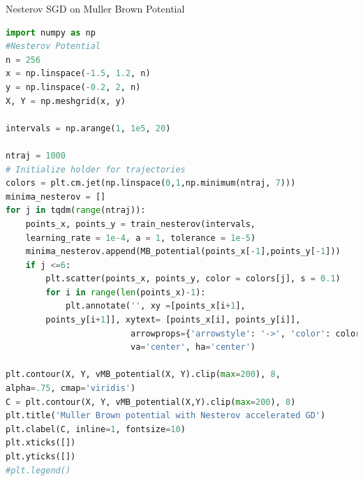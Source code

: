 \documentclass{article}
\begin{document}
\begin{codeblock}{Nesterov SGD on Muller Brown Potential}
\begin{lstlisting}[language=Python]
import numpy as np
#Nesterov Potential 
n = 256
x = np.linspace(-1.5, 1.2, n)
y = np.linspace(-0.2, 2, n)
X, Y = np.meshgrid(x, y)

intervals = np.arange(1, 1e5, 20)

ntraj = 1000
# Initialize holder for trajectories
colors = plt.cm.jet(np.linspace(0,1,np.minimum(ntraj, 7)))
minima_nesterov = []
for j in tqdm(range(ntraj)):
    points_x, points_y = train_nesterov(intervals,
    learning_rate = 1e-4, a = 1, tolerance = 1e-5)
    minima_nesterov.append(MB_potential(points_x[-1],points_y[-1]))
    if j <=6: 
        plt.scatter(points_x, points_y, color = colors[j], s = 0.1)
        for i in range(len(points_x)-1):
            plt.annotate('', xy =[points_x[i+1],
	    points_y[i+1]], xytext= [points_x[i], points_y[i]],
                         arrowprops={'arrowstyle': '->', 'color': colors[j],  'lw': 1},
                         va='center', ha='center')

plt.contour(X, Y, vMB_potential(X, Y).clip(max=200), 8,
alpha=.75, cmap='viridis')
C = plt.contour(X, Y, vMB_potential(X,Y).clip(max=200), 8)
plt.title('Muller Brown potential with Nesterov accelerated GD')
plt.clabel(C, inline=1, fontsize=10)
plt.xticks([])
plt.yticks([])
#plt.legend()    
\end{lstlisting}
    
\end{codeblock}

\newpage


\end{document}
